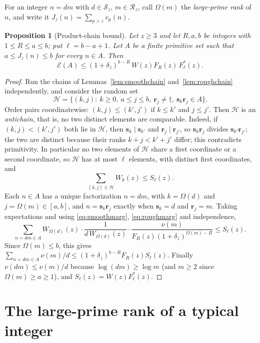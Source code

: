 \documentclass[11pt,a4paper]{article}
\numberwithin{equation}{section}
\theoremstyle{plain}
\newtheorem{proposition}[theorem]{Proposition}
\theoremstyle{definition}
\theoremstyle{remark}
\newcommand{\cE}{\mathcal{E}}
\newcommand{\cH}{\mathcal{H}}
\newcommand{\cS}{\mathcal{S}}
\newcommand{\cR}{\mathcal{R}}
\newcommand{\bs}{\mathbf{s}}
\newcommand{\br}{\mathbf{r}}
\begin{document}
For an integer $n=dm$ with $d\in\cS_z$, $m\in\cR_z$, call $\Omega(m)$ the \emph{large-prime rank} of $n$, and write it $J_z(n)=\sum_{p>z}v_p(n)$.

\begin{proposition}[Product-chain bound]\label{prop:product}
Let $z\ge3$ and let $R,a,b$ be integers with $1\le R\le a\le b$; put $\ell=b-a+1$. Let $A$ be a finite primitive set such that $a\le J_z(n)\le b$ for every $n\in A$. Then
\begin{equation}\label{eq:product}
\cE(A)\le(1+\delta_z)^{b-R}\,W(z)F_R(z)\,F^*_\ell(z).
\end{equation}
\end{proposition}

\begin{proof}
Run the chains of Lemmas~\ref{lem:smoothchain} and~\ref{lem:roughchain} independently, and consider the random set
\[
\cH=\{(k,j):\ k\ge0,\ a\le j\le b,\ \br_j\ne\dagger,\ \bs_k\br_j\in A\}.
\]
Order pairs coordinatewise: $(k,j)\le(k',j')$ if $k\le k'$ and $j\le j'$. Then $\cH$ is an \emph{antichain}, that is, no two distinct elements are comparable. Indeed, if $(k,j)<(k',j')$ both lie in $\cH$, then $\bs_k\mid\bs_{k'}$ and $\br_j\mid\br_{j'}$, so $\bs_k\br_j$ divides $\bs_{k'}\br_{j'}$; the two are distinct because their ranks $k+j<k'+j'$ differ; this contradicts primitivity. In particular no two elements of $\cH$ share a first coordinate or a second coordinate, so $\cH$ has at most $\ell$ elements, with distinct first coordinates, and
\[
\sum_{(k,j)\in\cH}W_k(z)\le S_\ell(z).
\]
Each $n\in A$ has a unique factorization $n=dm$, with $k=\Omega(d)$ and $j=\Omega(m)\in[a,b]$, and $n=\bs_k\br_j$ exactly when $\bs_k=d$ and $\br_j=m$. Taking expectations and using \eqref{eq:smoothmarg}, \eqref{eq:roughmarg} and independence,
\[
\sum_{n=dm\in A}W_{\Omega(d)}(z)\cdot\frac{1}{d\,W_{\Omega(d)}(z)}\cdot\frac{\nu(m)}{F_R(z)(1+\delta_z)^{\Omega(m)-R}}\le S_\ell(z).
\]
Since $\Omega(m)\le b$, this gives $\sum_{n=dm\in A}\nu(m)/d\le(1+\delta_z)^{b-R}F_R(z)S_\ell(z)$. Finally $\nu(dm)\le\nu(m)/d$ because $\log(dm)\ge\log m$ (and $m\ge2$ since $\Omega(m)\ge a\ge1$), and $S_\ell(z)=W(z)F^*_\ell(z)$.
\end{proof}

\section{The large-prime rank of a typical integer}\label{sec:largerank}
\end{document}
